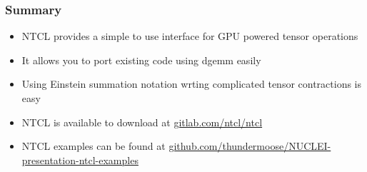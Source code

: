 \begin{frame}
\frametitle{Summary}
\begin{itemize}
\item NTCL provides a simple to use interface for GPU powered tensor operations
\item It allows you to port existing code using dgemm easily
\item Using Einstein summation notation wrting complicated tensor contractions is easy
\item NTCL is available to download at \url{gitlab.com/ntcl/ntcl}
\item NTCL examples can be found at \url{github.com/thundermoose/NUCLEI-presentation-ntcl-examples} 
\end{itemize}
\end{frame}

